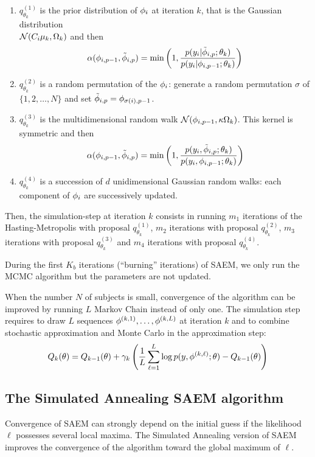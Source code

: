 \begin{enumerate}
\item $q_{\theta_k}^{(1)}$  is the prior distribution of ${\phi}_i$ at iteration $k$, that is the Gaussian distribution \\
${\cal N}(C_i\fixed_effect_k,\IIV_k)$ and then
$$ \alpha( {\phi}_{i,p-1} ,  \tilde{{\phi}}_{i,p} ) = \min \left(1, \frac{ p( y_i|\tilde{{\phi}}_{i,p};\theta_k) } { p( y_i|{\phi}_{i,p-1};\theta_k) } \right)$$
\item $q_{\theta_k}^{(2)}$ is a random permutation of the ${\phi}_i$: generate a random permutation $\sigma$ of $\{1,2,\ldots,N\}$ and
set $\tilde{{\phi}}_{i,p}={\phi}_{\sigma(i),p-1}$.
\item $q_{\theta_k}^{(3)}$ is the multidimensional random walk ${\cal N}( {\phi}_{i,p-1} , \kappa{\Omega}_k)$. This kernel is symmetric and then
$$ \alpha( {\phi}_{i,p-1} ,  \tilde{{\phi}}_{i,p} ) = \min \left(1, \frac{ p( y_i,\tilde{{\phi}}_{i,p};\theta_k) } { p( y_i,{\phi}_{i,p-1};\theta_k) } \right)$$
\item $q_{\theta_k}^{(4)}$ is a succession of $d$ unidimensional Gaussian random walks: each component of ${\phi}_i$ are successively updated.
\end{enumerate}
Then, the simulation-step at iteration $k$ consists in running $m_1$ iterations of the Hasting-Metropolis with proposal $q_{\theta_k}^{(1)}$, $m_2$
iterations with proposal $q_{\theta_k}^{(2)}$, $m_3$ iterations with proposal $q_{\theta_k}^{(3)}$ and $m_4$ iterations with proposal
$q_{\theta_k}^{(4)}$.


 During the first $K_b$ iterations (``burning'' iterations) of SAEM, we only run the MCMC algorithm but the parameters
are not updated.

  When the number $N$ of subjects is small, convergence of the algorithm can be improved by
running $L$ Markov Chain instead of only one. The simulation step requires to draw $L$ sequences $ { {\phi}^{(k,1)}} ,\ldots , { {\phi}^{(k,L)}} $ at
iteration $k$ and to combine stochastic approximation and Monte Carlo in the approximation step:
\begin{equation} \label{approx2}
 Q_k(\theta) = Q_{k-1}(\theta) + \gamma_k \left( \frac{1}{L}\sum_{\ell=1}^{L} \log p(y, { {\phi}^{(k,\ell)}} ;\theta) - Q_{k-1}(\theta) \right)
\end{equation}


\subsection{The Simulated Annealing SAEM algorithm}
Convergence of SAEM can strongly depend on the initial guess if the likelihood $\ell$ possesses
several local maxima. The Simulated Annealing version of SAEM improves the convergence of the
algorithm toward the global maximum of $\ell$.

